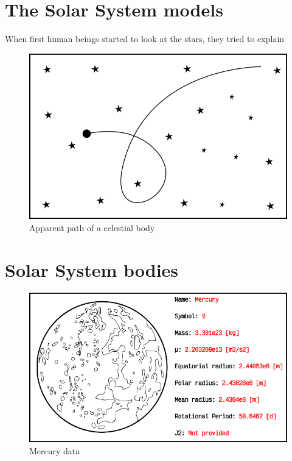 \section{The Solar System models}

When first human beings started to look at the stars, they tried to explain 

\begin{figure}[h]
	\centering
	\includegraphics[scale=0.75]{figs/sky_path.png}
	\caption{Apparent path of a celestial body}
\end{figure}


\newpage
\section{Solar System bodies}

\begin{figure}[h]
	\centering
	\includegraphics[scale=0.85]{figs/bodies/mercury.png}
	\caption{Mercury data}
\end{figure}